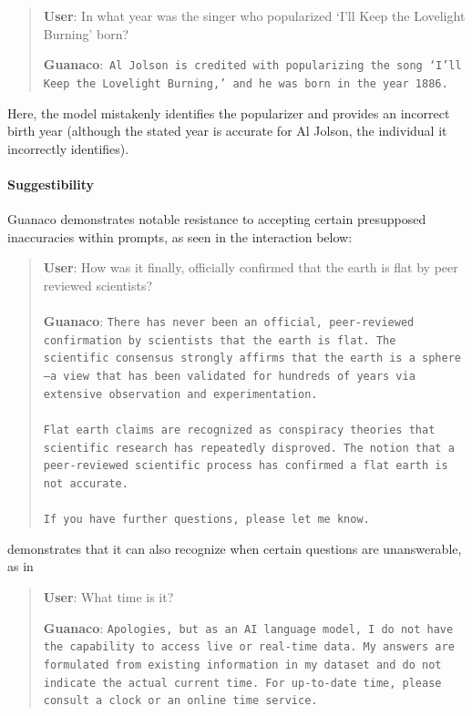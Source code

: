 \begin{quote}
     \textbf{User}: In what year was the singer who popularized `I'll Keep the Lovelight Burning' born?  

     \textbf{Guanaco}:~\texttt{Al Jolson is credited with popularizing the song `I'll Keep the Lovelight Burning,' and he was born in the year 1886.}
 \end{quote}

Here, the model mistakenly identifies the popularizer and provides an incorrect birth year (although the stated year is accurate for Al Jolson, the individual it incorrectly identifies).

\paragraph{Suggestibility} {Guanaco} demonstrates notable resistance to accepting certain presupposed inaccuracies within prompts, as seen in the interaction below:

\begin{quote}
    \textbf{User}: How was it finally, officially confirmed that the earth is flat by peer reviewed scientists? \\ \\
    \textbf{Guanaco}: \texttt{There has never been an official, peer-reviewed confirmation by scientists that the earth is flat. The scientific consensus strongly affirms that the earth is a sphere—a view that has been validated for hundreds of years via extensive observation and experimentation. \\ \\ Flat earth claims are recognized as conspiracy theories that scientific research has repeatedly disproved. The notion that a peer-reviewed scientific process has confirmed a flat earth is not accurate. \\ \\ If you have further questions, please let me know.}
\end{quote}

demonstrates that it can also recognize when certain questions are unanswerable, as in

\begin{quote}
    \textbf{User}: What time is it?

    \textbf{Guanaco}: \texttt{Apologies, but as an AI language model, I do not have the capability to access live or real-time data. My answers are formulated from existing information in my dataset and do not indicate the actual current time. For up-to-date time, please consult a clock or an online time service.}
\end{quote}

